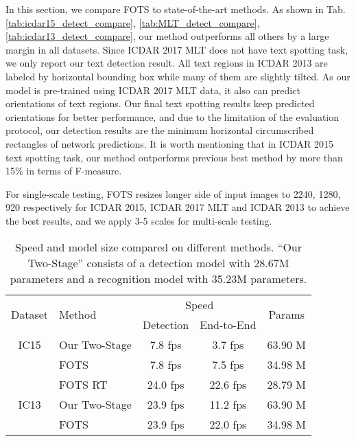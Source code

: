 \documentclass[10pt,twocolumn,letterpaper]{article}
\begin{document}
In this section, we compare FOTS to state-of-the-art methods. As shown in Tab. \ref{tab:icdar15_detect_compare}, \ref{tab:MLT_detect_compare}, \ref{tab:icdar13_detect_compare}, our method outperforms all others by a large margin in all datasets. Since ICDAR 2017 MLT does not have text spotting task, we only report our text detection result. All text regions in ICDAR 2013 are labeled by horizontal bounding box while many of them are slightly tilted. As our model is pre-trained using ICDAR 2017 MLT data, it also can predict orientations of text regions. Our final text spotting results keep predicted orientations for better performance, and due to the limitation of the evaluation protocol, our detection results are the minimum horizontal circumscribed rectangles of network predictions. It is worth mentioning that in ICDAR 2015 text spotting task, our method outperforms previous best method \cite{shi2017seglink,shi2016crnn} by more than 15\% in terms of F-measure.

For single-scale testing, FOTS resizes longer side of input images to 2240, 1280, 920 respectively for ICDAR 2015, ICDAR 2017 MLT and ICDAR 2013 to achieve the best results, and we apply 3-5 scales for multi-scale testing.

\begin{table}
\small
\setlength{\tabcolsep}{3pt}
\begin{center}
\begin{tabular}{c|l|c|c|c}
\hline
\multirow{2}{*}{Dataset} & \multirow{2}{*}{Method} & \multicolumn{2}{c|}{Speed} & \multicolumn{1}{c}{\multirow{2}{*}{Params}} \\ \cline{3-4}
           &             & \multicolumn{1}{c|}{Detection}  & \multicolumn{1}{c|}{End-to-End} & \\ \hline
IC15 & Our Two-Stage      & 7.8 fps         & 3.7 fps         & 63.90 M         \\
   & FOTS     & 7.8 fps         & 7.5 fps         & 34.98 M         \\
   & FOTS RT    & 24.0 fps         & 22.6 fps        & 28.79 M         \\ \hline
IC13 & Our Two-Stage      & 23.9 fps        & 11.2 fps        & 63.90 M         \\
   & FOTS     & 23.9 fps         & 22.0 fps        & 34.98 M         \\ \hline
\end{tabular}
\end{center}
\caption{Speed and model size compared on different methods. ``Our Two-Stage'' consists of a detection model with 28.67M parameters and a recognition model with 35.23M parameters.}
\label{tab:speed_model_size}
\end{table}
\end{document}
